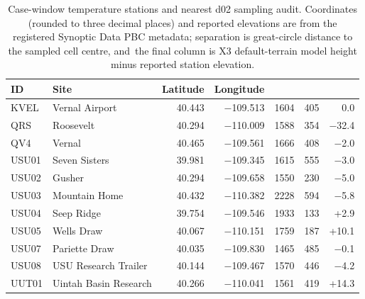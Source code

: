 \documentclass[air,article,accept,moreauthors]{Definitions/mdpi}
\begin{document}
\vspace{-3pt}
\begin{table}[H]
\caption{Case-window temperature stations and nearest d02 sampling audit.
Coordinates (rounded to three decimal places) and reported elevations are from the registered Synoptic Data PBC metadata; separation is great-circle distance to the sampled cell centre, and~the final column is X3 default-terrain model height minus reported station elevation.}
\label{tab:v3-stations}

\footnotesize
\setlength{\tabcolsep}{3pt}
\centering
\begin{tabularx}{\textwidth}{lLrrrrr}
\toprule
\textbf{ID} & \textbf{Site} & \textbf{Latitude} & \textbf{Longitude} & \textbf{} & \textbf{} & \textbf{} \\
\midrule
KVEL & Vernal Airport & 40.443 & $-$109.513 & 1604 & 405 & 0.0 \\
QRS & Roosevelt & 40.294 & $-$110.009 & 1588 & 354 & $-$32.4 \\
QV4 & Vernal & 40.465 & $-$109.561 & 1666 & 408 & $-$2.0 \\
USU01 & Seven Sisters & 39.981 & $-$109.345 & 1615 & 555 & $-$3.0 \\
USU02 & Gusher & 40.294 & $-$109.658 & 1550 & 230 & $-$5.0 \\
USU03 & Mountain Home & 40.432 & $-$110.382 & 2228 & 594 & $-$5.8 \\
USU04 & Seep Ridge & 39.754 & $-$109.546 & 1933 & 133 & +2.9 \\
USU05 & Wells Draw & 40.067 & $-$110.151 & 1759 & 187 & +10.1 \\
USU07 & Pariette Draw & 40.035 & $-$109.830 & 1465 & 485 & $-$0.1 \\
USU08 & USU Research Trailer & 40.144 & $-$109.467 & 1570 & 446 & $-$4.2 \\
UUT01 & Uintah Basin Research & 40.266 & $-$110.041 & 1561 & 419 & +14.3 \\
\bottomrule
\end{tabularx}
\end{table}
\end{document}
